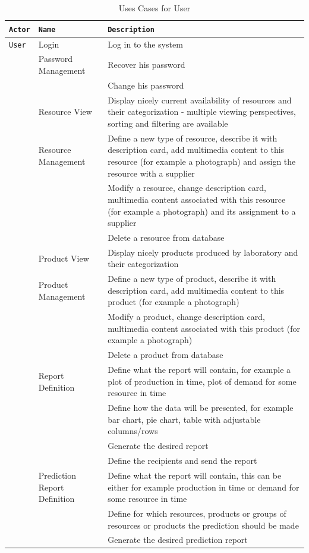 \documentclass[a4paper,11pt,twoside]{report}
\theoremstyle{definition}
\begin{document}
\begin{longtable}{|p{3cm}|p{3cm}|p{10cm}|}
\caption[Uses Cases for User]{Uses Cases for User}
\label{Uses Cases user}
\tabularnewline

\hline
\texttt{Actor} & \texttt{Name} & \texttt{Description} \\ \hline
\texttt{User} & Login & Log in to the system\\  \cline{2-3}
\texttt{} & Password Management & Recover his password\\  \cline{3-3}
\texttt{} & & Change his password\\ \cline{2-3}

\texttt{} & Resource View & Display nicely current availability of resources and their categorization - multiple viewing perspectives, sorting and filtering are available\\ \cline{2-3}
\texttt{} & Resource Management & Define a new type of resource, describe it with description card, add multimedia content to this resource (for example a photograph) and assign the resource with a supplier\\ \cline{3-3}
\texttt{} & & Modify a resource, change description card, multimedia content associated with this resource (for example a photograph) and its assignment to a supplier\\ \cline{3-3}
\texttt{} & & Delete a resource from database\\ \cline{2-3}

\texttt{} & Product View & Display nicely products produced by laboratory and their categorization\\ \cline{2-3}
\texttt{} & Product Management & Define a new type of product, describe it with description card, add multimedia content to this product (for example a photograph)\\ \cline{3-3}
\texttt{} & & Modify a product, change description card, multimedia content associated with this product (for example a photograph)\\ \cline{3-3}
\texttt{} & & Delete a product from database\\ \cline{2-3}
\texttt{} & Report Definition & Define what the report will contain, for example a plot of production in time, plot of demand for some resource in time\\ \cline{3-3}
\texttt{} &  & Define how the data will be presented, for example bar chart, pie chart, table with adjustable columns/rows \\ \cline{3-3}
\texttt{} &  & Generate the desired report \\ \cline{3-3}
\texttt{} &  & Define the recipients and send the report \\ \cline{2-3}
\texttt{} & Prediction Report Definition & Define what the report will contain, this can be either for example production in time or demand for some resource in time\\ \cline{3-3}
\texttt{} &  & Define for which resources, products or groups of resources or products the prediction should be made\\ \cline{3-3}
\texttt{} &  & Generate the desired prediction report \\ \cline{3-3}


\end{longtable}
\end{document}
